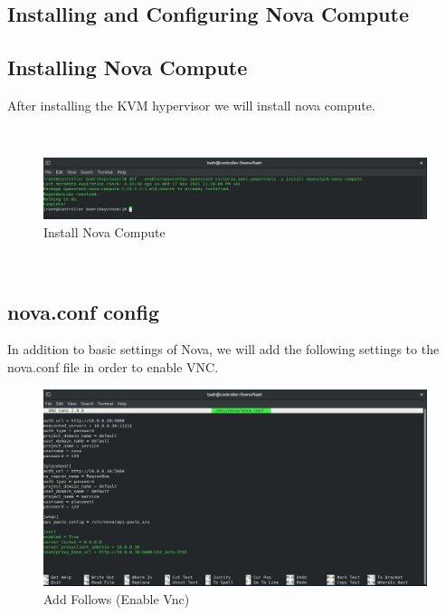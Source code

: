 \begin{spacing}{1.2}
\section{Installing and Configuring Nova Compute}
\subsection{Installing Nova Compute}
\par After installing the KVM hypervisor we will install nova compute.

\\
\begin{figure}[!htb] 
\begin{center} 
\includegraphics[width=1\linewidth]{Cloud/Installing and Configuring Nova Compute/Install Nova Compute} 
\end{center} 
\caption{Install Nova Compute} 
\end{figure} 
\FloatBarrier
\\
\subsection{nova.conf config}
\par In addition to basic settings of Nova, we will add the following settings to the nova.conf file in order to enable VNC.
\\
\begin{figure}[!htb] 
\begin{center} 
\includegraphics[width=1\linewidth]{Cloud/Installing and Configuring Nova Compute/Add Follows (Enable Vnc)} 
\end{center} 
\caption{Add Follows (Enable Vnc)} 
\end{figure} 
\FloatBarrier
\\


\end{spacing}
